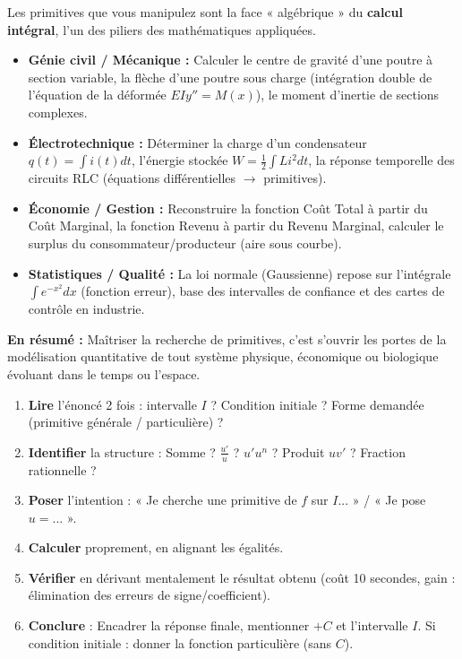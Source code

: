 \documentclass[11pt]{article}
\begin{document}
\begin{savaistu}
Les primitives que vous manipulez sont la face « algébrique » du \textbf{calcul intégral}, l'un des piliers des mathématiques appliquées.
\begin{itemize}
    \item \textbf{Génie civil / Mécanique :} Calculer le centre de gravité d'une poutre à section variable, la flèche d'une poutre sous charge (intégration double de l'équation de la déformée $EI y'' = M(x)$), le moment d'inertie de sections complexes.
    \item \textbf{Électrotechnique :} Déterminer la charge d'un condensateur $q(t)=\int i(t)dt$, l'énergie stockée $W=\frac{1}{2}\int L i^2 dt$, la réponse temporelle des circuits RLC (équations différentielles $\to$ primitives).
    \item \textbf{Économie / Gestion :} Reconstruire la fonction Coût Total à partir du Coût Marginal, la fonction Revenu à partir du Revenu Marginal, calculer le surplus du consommateur/producteur (aire sous courbe).
    \item \textbf{Statistiques / Qualité :} La loi normale (Gaussienne) repose sur l'intégrale $\int e^{-x^2}dx$ (fonction erreur), base des intervalles de confiance et des cartes de contrôle en industrie.
\end{itemize}
\textbf{En résumé :} Maîtriser la recherche de primitives, c'est s'ouvrir les portes de la modélisation quantitative de tout système physique, économique ou biologique évoluant dans le temps ou l'espace.
\end{savaistu}

\begin{methode}
\begin{enumerate}
    \item \textbf{Lire} l'énoncé 2 fois : intervalle $I$ ? Condition initiale ? Forme demandée (primitive générale / particulière) ?
    \item \textbf{Identifier} la structure : Somme ? $\frac{u'}{u}$ ? $u'u^n$ ? Produit $u v'$ ? Fraction rationnelle ?
    \item \textbf{Poser} l'intention : « Je cherche une primitive de $f$ sur $I$... » / « Je pose $u=...$ ».
    \item \textbf{Calculer} proprement, en alignant les égalités.
    \item \textbf{Vérifier} en dérivant mentalement le résultat obtenu (coût 10 secondes, gain : élimination des erreurs de signe/coefficient).
    \item \textbf{Conclure} : Encadrer la réponse finale, mentionner $+C$ et l'intervalle $I$. Si condition initiale : donner la fonction particulière (sans $C$).
\end{enumerate}
\end{methode}
\end{document}
